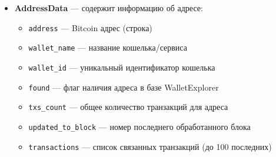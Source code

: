 \begin{itemize}
    \item \textbf{AddressData} --- содержит информацию об адресе:
    \begin{itemize}
        \item \texttt{address} --- Bitcoin адрес (строка)
        \item \texttt{wallet\_name} --- название кошелька/сервиса
        \item \texttt{wallet\_id} --- уникальный идентификатор кошелька
        \item \texttt{found} --- флаг наличия адреса в базе WalletExplorer
        \item \texttt{txs\_count} --- общее количество транзакций для адреса
        \item \texttt{updated\_to\_block} --- номер последнего обработанного блока
        \item \texttt{transactions} --- список связанных транзакций (до 100 последних)
    \end{itemize}
    

\end{itemize}
